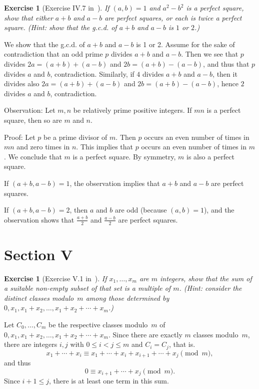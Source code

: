 \documentclass[12pt,letterpaper]{article}
\newtheorem{exer}[thm]{Exercise}
\theoremstyle{definition}
\begin{document}
\begin{exer}[Exercise IV.7 in~\cite{weil1979}] 
If $(a,b)=1$ and $a^2-b^2$ is a perfect square, show that either $a+b$ and $a-b$ are perfect squares, or each is twice a perfect square. (Hint: show that the g.c.d. of $a+b$ and $a-b$ is $1$ or $2$.) 
\end{exer} 

We show that the g.c.d. of $a+b$ and $a-b$ is 1 or 2. Assume for the sake of contradiction that an odd prime $p$ divides $a+b$ and $a-b$. Then we see that $p$ divides $2a=(a+b)+(a-b)$ and $2b=(a+b)-(a-b)$, and thus that $p$ divides $a$ and $b$, contradiction. Similarly, if $4$ divides $a+b$ and $a-b$, then it divides also $2a=(a+b)+(a-b)$ and $2b=(a+b)-(a-b)$, hence $2$ divides $a$ and $b$, contradiction. 

Observation: Let $m,n$ be relatively prime positive integers. If $mn$ is a perfect square, then so are $m$ and $n$. 

Proof: Let $p$ be a prime divisor of $m$. Then $p$ occurs an even number of times in $mn$ and zero times in $n$. This implies that $p$ occurs an even number of times in $m$. We conclude that $m$ is a perfect square. By symmetry, $m$ is also a perfect square.

If $(a+b,a-b)=1$, the observation implies that $a+b$ and $a-b$ are perfect squares. 

If $(a+b,a-b)=2$, then $a$ and $b$ are odd (because $(a,b)=1$), and the observation shows that $\frac{a+b}{2}$ and $\frac{a-b}{2}$ are perfect squares. 

\section{Section V} 

\begin{exer}[Exercise V.1 in~\cite{weil1979}]
If $x_1,\ldots,x_m$ are $m$ integers, show that the sum of a suitable non-empty subset of that set is a multiple of $m$. (Hint: consider the distinct classes modulo~$m$ among those determined by $0,x_1,x_1+x_2,\ldots,x_1+x_2+\cdots+x_m$.) 
\end{exer}

Let $C_0, \ldots, C_m$ be the respective classes modulo~$m$ of $0,x_1,x_1+x_2,\ldots,x_1+x_2+\cdots+x_m$. Since there are exactly $m$ classes modulo~$m$, there are integers $i,j$ with $0\le i<j\le m$ and $C_i=C_j$, that is. 
$$
x_1+\cdots+x_i \equiv x_1+\cdots+x_i+x_{i+1}+\cdots+x_j \pmod{m},
$$ 
and thus 
$$
0 \equiv x_{i+1}+\cdots+x_j \pmod{m}.
$$ 
Since $i+1\le j$, there is at least one term in this sum. 
\end{document}
